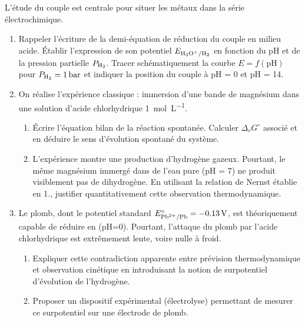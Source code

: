 \documentclass[11pt]{article}
\begin{document}
\begin{exercice}
L'étude du couple  est centrale pour situer les métaux dans la série électrochimique.
\begin{enumerate}
    \item Rappeler l'écriture de la demi-équation de réduction du couple  en milieu acide. Établir l'expression de son potentiel $E_{\ce{H3O+/H2}}$ en fonction du pH et de la pression partielle $P_{\ce{H2}}$. Tracer schématiquement la courbe $E = f(\text{pH})$ pour $P_{\ce{H2}} = \SI{1}{bar}$ et indiquer la position du couple à pH = 0 et pH = 14.
    \item On réalise l'expérience classique : immersion d'une bande de magnésium dans une solution d'acide chlorhydrique \SI{1}{mol.L^{-1}}.
    \begin{enumerate}
        \item Écrire l'équation bilan de la réaction spontanée. Calculer $\Delta_r G^{\circ}$ associé et en déduire le sens d'évolution spontané du système.
        \item L'expérience montre une production d'hydrogène gazeux. Pourtant, le même magnésium immergé dans de l'eau pure (pH = 7) ne produit visiblement pas de dihydrogène. En utilisant la relation de Nernst établie en 1., justifier quantitativement cette observation thermodynamique.
    \end{enumerate}
    \item Le plomb, dont le potentiel standard $E^{\circ}_{\ce{Pb^{2+}/Pb}} = \SI{-0,13}{V}$, est théoriquement capable de réduire  en  (pH=0). Pourtant, l'attaque du plomb par l'acide chlorhydrique est extrêmement lente, voire nulle à froid.
    \begin{enumerate}
        \item Expliquer cette contradiction apparente entre prévision thermodynamique et observation cinétique en introduisant la notion de surpotentiel d'évolution de l'hydrogène.
        \item Proposer un dispositif expérimental (électrolyse) permettant de mesurer ce surpotentiel sur une électrode de plomb.
    \end{enumerate}
\end{enumerate}
\end{exercice}
\end{document}
